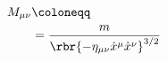 \documentclass{standalone}
\begin{document}
\begin{align}
M_{\mu\nu} &\coloneqq %
\nonumber \\
&= \frac{m}{\rbr{-\eta_{\mu\nu} \dot{x}^\mu \dot{x}^\nu}^{3/2}} %


\end{align}
\end{document}
